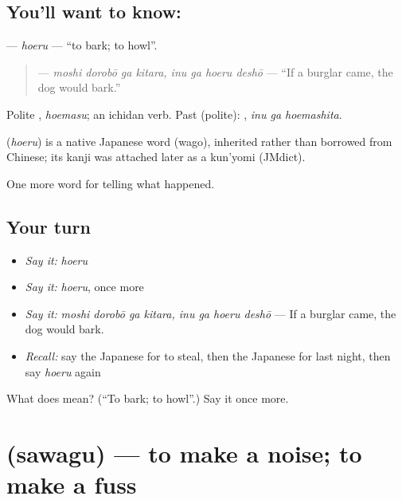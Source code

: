 \subsection*{You'll want to know: }
\textbf{} — \emph{hoeru} — \textquotedblleft{}to bark; to howl\textquotedblright{}.

\begin{quote}
\textbf{   } — \emph{moshi dorobō ga kitara, inu ga hoeru deshō} — \textquotedblleft{}If a burglar came, the dog would bark.\textquotedblright{}
\end{quote}

Polite \textbf{}, \emph{hoemasu}; an ichidan verb. Past (polite): \textbf{ }, \emph{inu ga hoemashita}.

\begin{cousinweb}
\textbf{} (\emph{hoeru}) is a native Japanese word (wago), inherited rather than borrowed from Chinese; its kanji was attached later as a kun'yomi (JMdict).
\end{cousinweb}

\begin{grammarlens}[title={What you've built}]
One more word for telling what happened.
\end{grammarlens}

\subsection*{Your turn}
\begin{itemize}
\raggedright
  \item \emph{Say it:} \emph{hoeru}
  \item \emph{Say it:} \emph{hoeru}, once more
  \item \emph{Say it:} \emph{moshi dorobō ga kitara, inu ga hoeru deshō} — If a burglar came, the dog would bark.
  \item \emph{Recall:} say the Japanese for to steal, then the Japanese for last night, then say \emph{hoeru} again
\end{itemize}

\begin{tcolorbox}[breakable,colback=teal!4,colframe=teal!35!black,title={Before you move on}]
What does  mean? (\textquotedblleft{}To bark; to howl\textquotedblright{}.) Say it once more.
\end{tcolorbox}
\section[\texorpdfstring{\ja{さわぐ} (sawagu)}{さわぐ (sawagu)}]{ (sawagu) — to make a noise; to make a fuss}

